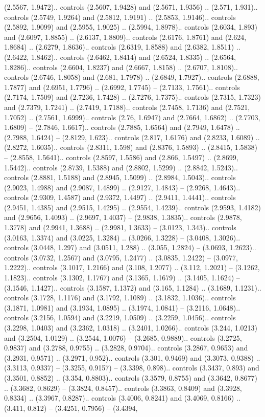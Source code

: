 (2.5567, 1.9472).. controls (2.5607, 1.9428) and (2.5671, 1.9356) .. (2.571, 1.931).. controls (2.5749, 1.9264) and (2.5812, 1.9191) .. (2.5853, 1.9146).. controls (2.5892, 1.9099) and (2.5955, 1.9025) .. (2.5994, 1.8978).. controls (2.6034, 1.893) and (2.6097, 1.8855) .. (2.6137, 1.8809).. controls (2.6176, 1.8761) and (2.624, 1.8684) .. (2.6279, 1.8636).. controls (2.6319, 1.8588) and (2.6382, 1.8511) .. (2.6422, 1.8462).. controls (2.6462, 1.8414) and (2.6524, 1.8335) .. (2.6564, 1.8286).. controls (2.6604, 1.8237) and (2.6667, 1.8158) .. (2.6707, 1.8108).. controls (2.6746, 1.8058) and (2.681, 1.7978) .. (2.6849, 1.7927).. controls (2.6888, 1.7877) and (2.6951, 1.7796) .. (2.6992, 1.7745) -- (2.7133, 1.7561).. controls (2.7174, 1.7509) and (2.7236, 1.7428) .. (2.7276, 1.7375).. controls (2.7315, 1.7323) and (2.7379, 1.7241) .. (2.7419, 1.7188).. controls (2.7458, 1.7136) and (2.7521, 1.7052) .. (2.7561, 1.6999).. controls (2.76, 1.6947) and (2.7664, 1.6862) .. (2.7703, 1.6809) -- (2.7846, 1.6617).. controls (2.7885, 1.6564) and (2.7949, 1.6478) .. (2.7988, 1.6424) -- (2.8129, 1.623).. controls (2.817, 1.6176) and (2.8233, 1.6089) .. (2.8272, 1.6035).. controls (2.8311, 1.598) and (2.8376, 1.5893) .. (2.8415, 1.5838) -- (2.8558, 1.5641).. controls (2.8597, 1.5586) and (2.866, 1.5497) .. (2.8699, 1.5442).. controls (2.8739, 1.5388) and (2.8802, 1.5299) .. (2.8842, 1.5243).. controls (2.8881, 1.5188) and (2.8945, 1.5099) .. (2.8984, 1.5043).. controls (2.9023, 1.4988) and (2.9087, 1.4899) .. (2.9127, 1.4843) -- (2.9268, 1.4643).. controls (2.9309, 1.4587) and (2.9372, 1.4497) .. (2.9411, 1.4441).. controls (2.9451, 1.4385) and (2.9515, 1.4295) .. (2.9554, 1.4239).. controls (2.9593, 1.4182) and (2.9656, 1.4093) .. (2.9697, 1.4037) -- (2.9838, 1.3835).. controls (2.9878, 1.3778) and (2.9941, 1.3688) .. (2.9981, 1.3633) -- (3.0123, 1.343).. controls (3.0163, 1.3374) and (3.0225, 1.3284) .. (3.0266, 1.3228) -- (3.0408, 1.3026).. controls (3.0448, 1.297) and (3.0511, 1.288) .. (3.055, 1.2824) -- (3.0693, 1.2623).. controls (3.0732, 1.2567) and (3.0795, 1.2477) .. (3.0835, 1.2422) -- (3.0977, 1.2222).. controls (3.1017, 1.2166) and (3.108, 1.2077) .. (3.112, 1.2021) -- (3.1262, 1.1823).. controls (3.1302, 1.1767) and (3.1365, 1.1679) .. (3.1405, 1.1624) -- (3.1546, 1.1427).. controls (3.1587, 1.1372) and (3.165, 1.1284) .. (3.1689, 1.1231).. controls (3.1728, 1.1176) and (3.1792, 1.1089) .. (3.1832, 1.1036).. controls (3.1871, 1.0981) and (3.1934, 1.0895) .. (3.1974, 1.0841) -- (3.2116, 1.0648).. controls (3.2156, 1.0594) and (3.2219, 1.0509) .. (3.2259, 1.0456).. controls (3.2298, 1.0403) and (3.2362, 1.0318) .. (3.2401, 1.0266).. controls (3.244, 1.0213) and (3.2504, 1.0129) .. (3.2544, 1.0076) -- (3.2685, 0.9889).. controls (3.2725, 0.9837) and (3.2788, 0.9755) .. (3.2828, 0.9704).. controls (3.2867, 0.9653) and (3.2931, 0.9571) .. (3.2971, 0.952).. controls (3.301, 0.9469) and (3.3073, 0.9388) .. (3.3113, 0.9337) -- (3.3255, 0.9157) -- (3.3398, 0.898).. controls (3.3437, 0.893) and (3.3501, 0.8852) .. (3.354, 0.8803).. controls (3.3579, 0.8755) and (3.3642, 0.8677) .. (3.3682, 0.8629) -- (3.3824, 0.8457).. controls (3.3863, 0.8409) and (3.3928, 0.8334) .. (3.3967, 0.8287).. controls (3.4006, 0.8241) and (3.4069, 0.8166) .. (3.411, 0.812) -- (3.4251, 0.7956) -- (3.4394, 